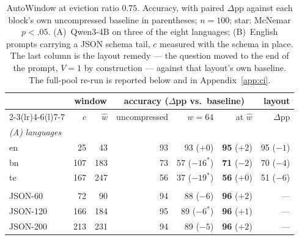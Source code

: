 \documentclass{article}
\newcommand{\blind}[1]{\cellcolor{blindcell}#1}
\begin{document}
\begin{table}[t]
\caption{AutoWindow at eviction ratio $0.75$. Accuracy, with
paired $\Delta$pp against each block's own uncompressed baseline in
parentheses; $n{=}100$; star: McNemar $p<.05$. (A)~Qwen3-4B on three
of the eight languages; (B)~English prompts carrying a JSON schema
tail, $c$ measured with the schema in place. The last column is the
layout remedy --- the question moved to the end of the prompt,
$V{=}1$ by construction --- against that layout's own baseline. The
full-pool re-run is reported below and in Appendix~\ref{app:ci}.}
\label{tab:aw}
\centering
\small
\begin{tabular}{lrr@{\hspace{1.6em}}rrrr}
\toprule
 & \multicolumn{2}{c}{window} & \multicolumn{3}{c}{accuracy ($\Delta$pp vs.\ baseline)} & layout \\
\cmidrule(lr){2-3}\cmidrule(lr){4-6}\cmidrule(l){7-7}
 & $c$ & $\hat w$ & uncompressed & $w{=}64$ & at $\hat w$ & $\Delta$pp \\
\midrule
\multicolumn{7}{l}{\emph{(A) languages}} \\
en & 25 & 43 & 93 & 93 (${+}0$) & \textbf{95} (${+}2$) & 95 (${-}1$) \\
bn & 107 & 183 & 73 & \blind{57 (${-}16^{*}$)} & \textbf{71} (${-}2$) & 70 (${-}4$) \\
te & 167 & 247 & 56 & \blind{37 (${-}19^{*}$)} & \textbf{56} (${+}0$) & 51 (${-}6$) \\
\addlinespace
\multicolumn{7}{l}{\emph{(B) English with a JSON schema tail}} \\
JSON-60 & 72 & 90 & 94 & \blind{88 (${-}6$)} & \textbf{96} (${+}2$) & --- \\
JSON-120 & 166 & 184 & 95 & \blind{89 (${-}6^{*}$)} & \textbf{96} (${+}1$) & --- \\
JSON-200 & 213 & 231 & 94 & \blind{89 (${-}5$)} & \textbf{96} (${+}2$) & --- \\
\bottomrule
\end{tabular}
\end{table}
\end{document}
